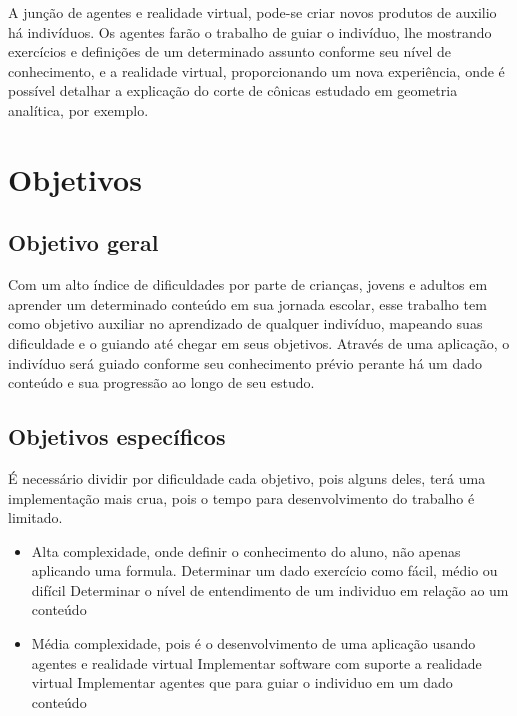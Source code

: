 \documentclass[12pt]{article}
\begin{document}
    A junção de agentes e realidade virtual, pode-se criar novos produtos de auxilio há indivíduos. Os agentes farão o trabalho de guiar o indivíduo, lhe mostrando exercícios e definições de um determinado assunto conforme seu nível de conhecimento, e a realidade virtual, proporcionando um nova experiência, onde é possível detalhar a explicação do corte de cônicas estudado em geometria analítica, por exemplo.

\newpage
\section{Objetivos}

\subsection{Objetivo geral}

   \hspace*{5mm}Com um alto índice de dificuldades por parte de crianças, jovens e adultos em aprender um determinado conteúdo em sua jornada escolar, esse trabalho tem como objetivo auxiliar no aprendizado de qualquer indivíduo, mapeando suas dificuldade e o guiando até chegar em seus objetivos. Através de uma aplicação, o indivíduo será guiado conforme seu conhecimento prévio perante há um dado conteúdo e sua progressão ao longo de seu estudo.
\subsection{Objetivos específicos}
    \hspace*{5mm}

    É necessário dividir por dificuldade cada objetivo, pois alguns deles, terá uma implementação mais crua, pois o tempo para desenvolvimento do trabalho é limitado.


    \begin{itemize}
        \item Alta complexidade, onde definir o conhecimento do aluno, não apenas aplicando uma formula.
        \subitem Determinar um dado exercício como fácil, médio ou difícil
        \subitem Determinar o nível de entendimento de um individuo em relação ao um conteúdo
        \item Média complexidade, pois é o desenvolvimento de uma aplicação usando agentes e realidade virtual
        \subitem Implementar software com suporte a realidade virtual
        \subitem Implementar agentes que para guiar o individuo em um dado conteúdo
    \end{itemize}
\end{document}
